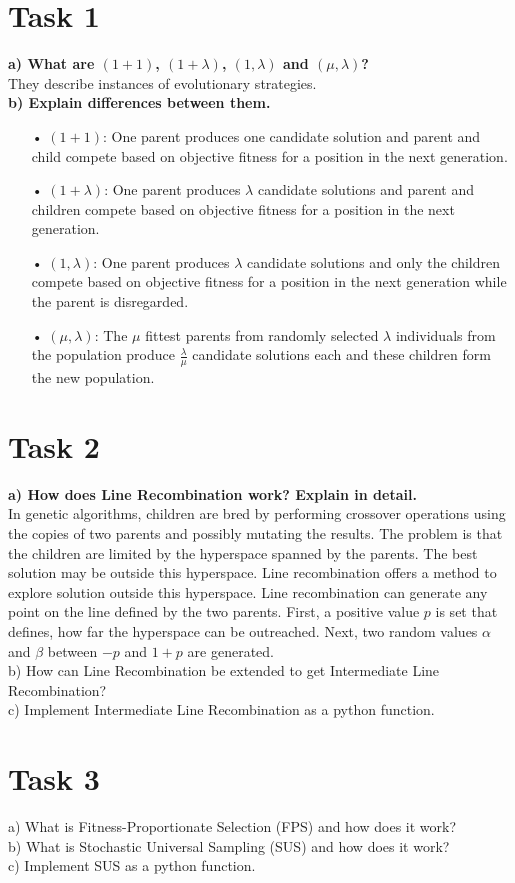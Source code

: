 \documentclass[12pt,letterpaper]{article}
\begin{document}
\section*{Task 1}
\textbf{a) What are $(1+1)$, $(1 + \lambda)$, $(1,\lambda)$ and $(\mu,\lambda)$?}\\
They describe instances of evolutionary strategies.\\

\textbf{b) Explain differences between them.}
\begin{enumerate}
\item[•] $(1+1)$: One parent produces one candidate solution and parent and child compete based on objective fitness for a position in the next generation.
\item[•] $(1 + \lambda)$: One parent produces $\lambda$ candidate solutions and parent and children compete based on objective fitness for a position in the next generation.
\item[•] $(1 , \lambda)$: One parent produces $\lambda$ candidate solutions and only the children compete based on objective fitness for a position in the next generation while the parent is disregarded.
\item[•] $(\mu , \lambda)$: The $\mu$ fittest parents from randomly selected $\lambda$ individuals from the population produce $\frac{\lambda}{\mu}$  candidate solutions each and these children form the new population.
\end{enumerate}

\section*{Task 2}
\textbf{a) How does Line Recombination work? Explain in detail.} \\
In genetic algorithms, children are bred by performing crossover operations using the copies of two parents and possibly mutating the results. The problem is that the children are limited by the hyperspace spanned by the parents. The best solution may be outside this hyperspace. Line recombination offers a method to explore solution outside this hyperspace. Line recombination can generate any point on the line defined by the two parents. First, a positive value $p$ is set that defines, how far the hyperspace can be outreached. Next, two  random values $\alpha$ and $\beta$ between $-p$ and $1+p$ are generated.\\

b)  How can Line Recombination be extended to get Intermediate Line Recombination? \\

c)  Implement Intermediate Line Recombination as a python function.

\section*{Task 3}
a)  What is Fitness-Proportionate Selection (FPS) and how does it work? \\

b)  What is Stochastic Universal Sampling (SUS) and how does it work? \\

c)  Implement SUS as a python function.
\end{document}
